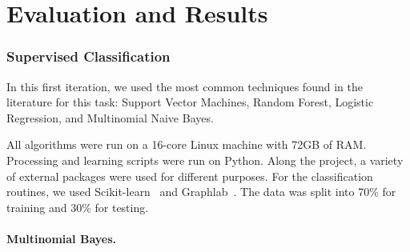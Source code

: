 
\chapter{Evaluation and Results}
\label{cha:evaluation-results}

\subsection{Supervised Classification}


In this first iteration, we used the most common techniques found in the literature for this task:
Support Vector Machines, Random Forest, Logistic Regression, and Multinomial Naive Bayes.

All algorithms were run on a 16-core Linux machine with 72GB of RAM.  Processing and learning scripts were run on Python. %
Along the project, a variety of external packages were used for different purposes. For the classification routines, we used Scikit-learn~\cite{sklearn} and Graphlab~\cite{graphlab}.
The data was split into 70\% for training and 30\% for testing.








\subsubsection{Multinomial Bayes.}
 
